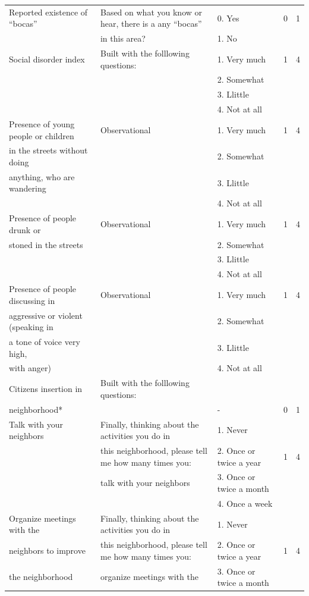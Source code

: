\documentclass[11pt]{article}
\begin{document}
\begin{tiny}
\begin{tabular}{lllcc}
Reported existence of ``bocas'' &	Based on what you know or hear, there is a any ``bocas'' &	0. Yes	&	0	&	1	\\
	&	in this area?	&	1. No 	&		&		\\\hline
Social disorder index	&	Built with the folllowing questions:	&	1. Very much	&	1	&	4	\\
	&		&	2. Somewhat	&		&		\\
	&		&	3. Llittle	&		&		\\
	&		&	4. Not at all	&		&		\\
Presence of young people or children 	&	Observational	&	1. Very much	&	1	&	4	\\
in the streets without doing	&		&	2. Somewhat	&		&		\\
 anything, who are wandering	&		&	3. Llittle	&		&		\\
	&		&	4. Not at all	&		&		\\
Presence of   people drunk or 	&	Observational	&	1. Very much	&	1	&	4	\\
stoned in the streets	&		&	2. Somewhat	&		&		\\
	&		&	3. Llittle	&		&		\\
	&		&	4. Not at all	&		&		\\
Presence of people discussing in 	&	Observational	&	1. Very much	&	1	&	4	\\
aggressive or violent (speaking in 	&		&	2. Somewhat	&		&		\\
a tone of voice very high, 	&		&	3. Llittle	&		&		\\
with anger)	&		&	4. Not at all	&		&		\\\hline
Citizens insertion in 	&	Built with the folllowing questions:	&		&		&		\\
neighborhood*	&		&	-	&	0	&	1	\\
Talk with your neighbors	&	Finally, thinking about the activities you do in 	&	1. Never	&		&		\\
	&	this neighborhood, please tell me how many times you:	&	2. Once or twice a year	&	1	&	4	\\
	&	talk with your neighbors	&	3. Once or twice a month	&		&		\\
	&		&	4. Once a week	&		&		\\
Organize meetings with the 	&	Finally, thinking about the activities you do in 	&	1. Never	&		&		\\
neighbors to improve 	&	this neighborhood, please tell me how many times you:	&	2. Once or twice a year	&	1	&	4	\\
the neighborhood	&	organize meetings with the 	&	3. Once or twice a month	&		&		\\

\end{tabular}
\end{tiny}
\end{document}
